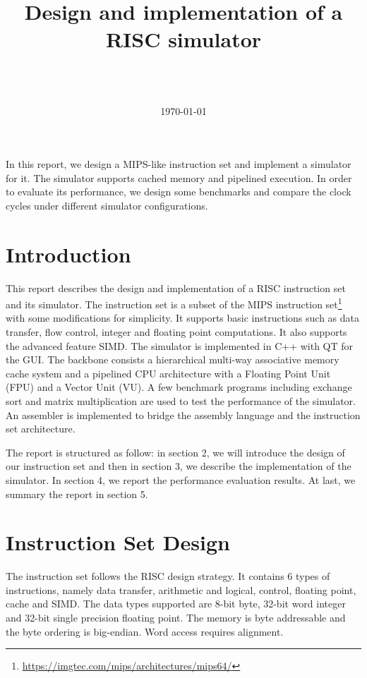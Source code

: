 \documentclass{sig-alternate}
\begin{document}
\title{Design and implementation of a RISC simulator}
\author{
\and
{} \\  \\
}

\date{\today}
\maketitle
\abstract
In this report, we design a MIPS-like instruction set and implement a simulator for it. The simulator supports cached memory and pipelined execution. In order to evaluate its performance, we design some benchmarks and compare the clock cycles under different simulator configurations.

\section{Introduction}
This report describes the design and implementation of a RISC instruction set and its simulator. The instruction set is a subset of the MIPS instruction set\footnote{\url{https://imgtec.com/mips/architectures/mips64/}} with some modifications for simplicity. It supports basic instructions such as data transfer, flow control, integer and floating point computations. It also supports the advanced feature SIMD. The simulator is implemented in C++ with QT for the GUI. The backbone consists a hierarchical multi-way associative memory cache system and a pipelined CPU architecture with a Floating Point Unit (FPU) and a Vector Unit (VU). A few benchmark programs including exchange sort and matrix multiplication are used to test the performance of the simulator. An assembler is implemented to bridge the assembly language and the instruction set architecture.

The report is structured as follow: in section 2, we will introduce the design of our instruction set and then in section 3, we describe the implementation of the simulator. In section 4, we report the performance evaluation results.  At last, we summary the report in section 5.

\section{Instruction Set Design}
The instruction set follows the RISC design strategy. It contains 6 types of instructions, namely data transfer, arithmetic and logical, control, floating point, cache and SIMD. The data types supported are 8-bit byte, 32-bit word integer and 32-bit single precision floating point. The memory is byte addressable and the byte ordering is big-endian. Word access requires alignment. 
\end{document}
